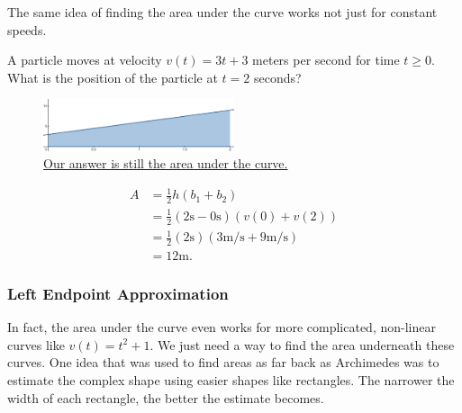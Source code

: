 The same idea of finding the area under the curve works not just for constant speeds.
\begin{example}
	A particle moves at velocity $v(t) = 3t + 3$ meters per second for time $t \geq 0$.
	What is the position of the particle at $t = 2$ seconds?
\end{example}
\begin{answer}
	\begin{figure}[H]
		\label{linear_graph}
		\centering
		\includegraphics[width = 0.5\textwidth]{./integrals/linear_graph.png}
		\caption{\hyperref{}{}{}{Our answer is still the area under the curve.}}
	\end{figure}
	\begin{align*}
		A &= \frac{1}{2}h(b_1 + b_2) \\
		&= \frac{1}{2}(2\text{s}-0\text{s})(v(0) + v(2)) \\
		&= \frac{1}{2}(2\text{s})(3\text{m/s} + 9\text{m/s}) \\
		&= 12\text{m}.
	\end{align*}
\end{answer}

\subsubsection{Left Endpoint Approximation}
In fact, the area under the curve even works for more complicated, non-linear curves like $v(t) = t^2 + 1$.
We just need a way to find the area underneath these curves.
One idea that was used to find areas as far back as Archimedes was to estimate the complex shape using easier shapes like rectangles.
The narrower the width of each rectangle, the better the estimate becomes.
 

